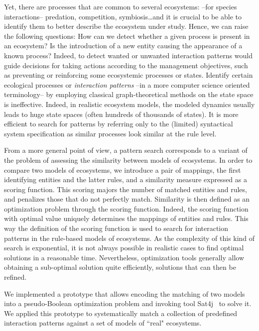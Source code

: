 \documentclass[a4paper,twoside]{article}
\begin{document}
Yet, there are processes that are common to several ecosystems: \eg --for species interactions-- predation, competition, symbiosis\ldots  and it is crucial to be able to identify them to better describe the ecosystem under study. Hence, we can raise the following questions: How can we detect whether a given process is present in an ecosystem? Is the introduction of a new entity causing the appearance of a known process? 
Indeed, to detect wanted or unwanted interaction patterns would guide decisions for taking actions according to the management objectives, such as preventing or reinforcing some ecosystemic processes or states. 
Identify certain ecological processes or  \emph{interaction patterns} --in a more computer science oriented terminology--  by employing classical graph-theoretical methods on the state space is ineffective. 
Indeed, in realistic ecosystem models, the modeled dynamics usually leads to huge state spaces (often hundreds of thousands of states). 
It is more efficient to search for patterns by referring only to the (limited) syntactical system specification as similar processes look similar at the rule level.  

From a more general point of view, a pattern search corresponds to a variant of the  problem of assessing the similarity between models of ecosystems. 
%
In order to compare two  models of ecosystems, we introduce a pair of mappings, the first identifying entities and the latter rules, and a similarity measure expressed as a scoring function.  
This scoring majors the number of matched entities and rules, and penalizes those that do not perfectly match. 
Similarity is then defined as an optimization problem through the scoring function. Indeed, the scoring function with optimal value uniquely determines the mappings of entities and rules. This way the definition of the scoring function is used to search for interaction patterns in the rule-based models of ecosystems. 
As the complexity of this kind of search is exponential, it is not always possible in realistic cases to find optimal solutions in a reasonable time. 
Nevertheless, optimization tools generally allow obtaining a sub-optimal solution quite efficiently, solutions that can then be refined. 

We implemented a prototype that allows encoding the matching of two models into a pseudo-Boolean optimization problem and invoking tool Sat4j~\cite{sat4j} to solve it. 
We applied this prototype to systematically match a collection of predefined interaction patterns against a set of models of ``real" ecosystems. 
 
\end{document}

